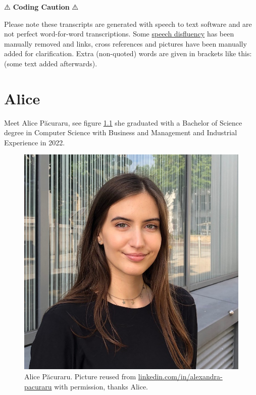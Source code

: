 \documentclass[
]{book}
\begin{document}
⚠️ \textbf{Coding Caution} ⚠️

Please note these transcripts are generated with speech to text software and are not perfect word-for-word transcriptions. Some \href{https://en.wikipedia.org/wiki/Speech_disfluency}{speech disfluency} has been manually removed and links, cross references and pictures have been manually added for clarification. Extra (non-quoted) words are given in brackets like this: (some text added afterwards).

\hypertarget{alice}{%
\chapter{Alice}\label{alice}}

Meet Alice Păcuraru, see figure \ref{fig:alice-fig} she graduated with a Bachelor of Science degree in Computer Science with Business and Management and Industrial Experience in 2022.

\begin{figure}

{\centering \includegraphics[width=1\linewidth]{images/alice} 

}

\caption{Alice Păcuraru. Picture reused from \href{https://uk.linkedin.com/in/alexandra-pacuraru}{linkedin.com/in/alexandra-pacuraru} with permission, thanks Alice.}\label{fig:alice-fig}
\end{figure}
\end{document}
